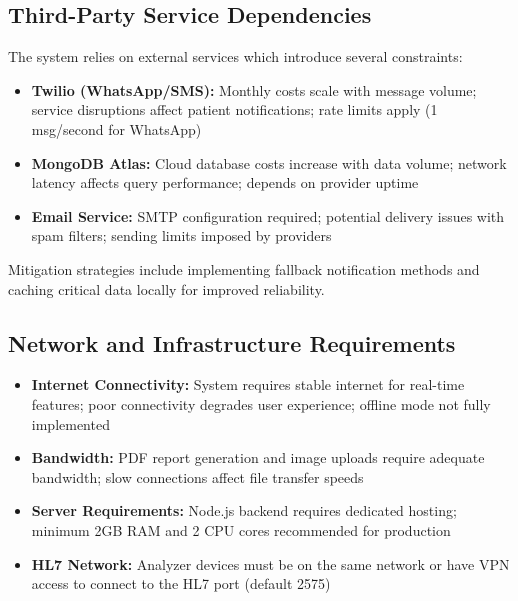 \documentclass[12pt, a4paper]{report}
\begin{document}
\subsection{Third-Party Service Dependencies}
The system relies on external services which introduce several constraints:
\begin{itemize}
    \item \textbf{Twilio (WhatsApp/SMS):} Monthly costs scale with message volume; service disruptions affect patient notifications; rate limits apply (1 msg/second for WhatsApp)
    \item \textbf{MongoDB Atlas:} Cloud database costs increase with data volume; network latency affects query performance; depends on provider uptime
    \item \textbf{Email Service:} SMTP configuration required; potential delivery issues with spam filters; sending limits imposed by providers
\end{itemize}

Mitigation strategies include implementing fallback notification methods and caching critical data locally for improved reliability.

\subsection{Network and Infrastructure Requirements}
\begin{itemize}
    \item \textbf{Internet Connectivity:} System requires stable internet for real-time features; poor connectivity degrades user experience; offline mode not fully implemented
    \item \textbf{Bandwidth:} PDF report generation and image uploads require adequate bandwidth; slow connections affect file transfer speeds
    \item \textbf{Server Requirements:} Node.js backend requires dedicated hosting; minimum 2GB RAM and 2 CPU cores recommended for production
    \item \textbf{HL7 Network:} Analyzer devices must be on the same network or have VPN access to connect to the HL7 port (default 2575)
\end{itemize}
\end{document}
